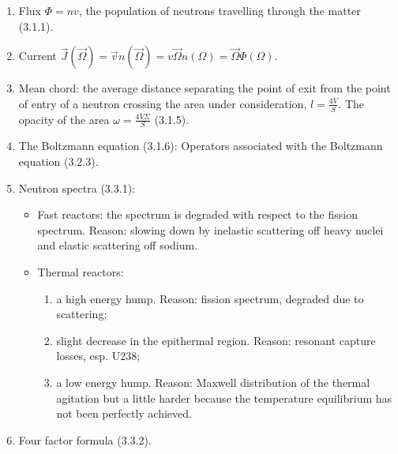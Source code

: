 \documentclass{school-22.211-notes}
\begin{document}
\clearpage
\begin{enumerate}
\item Flux $\Phi = n v$, the population of neutrons travelling through the matter (3.1.1). 
\item Current $\vec{J}(\vec{\Omega}) = \vec{v} n(\vec{\Omega}) = v \vec{\Omega} n(\Omega) = \vec{\Omega} \Phi(\Omega).$
\item Mean chord: the average distance separating the point of exit from the point of entry of a neutron crossing the area under consideration, $l = \frac{4V}{S}$. The opacity of the area $\omega = \frac{4V\Sigma}{S}$ (3.1.5). 
\item The Boltzmann equation (3.1.6): 
Operators associated with the Boltzmann equation (3.2.3).
\item Neutron spectra (3.3.1):
  \begin{itemize}
  \item Fast reactors: the spectrum is degraded with respect to the fission spectrum. Reason: slowing down by inelastic scattering off heavy nuclei and elastic scattering off sodium.
  \item Thermal reactors: 
    \begin{enumerate}
      \item a high energy hump. Reason: fission spectrum, degraded due to scattering; 
      \item slight decrease in the epithermal region. Reason: resonant capture losses, esp. U238; 
      \item  a low energy hump. Reason: Maxwell distribution of the thermal agitation but a little harder because the temperature equilibrium has not been perfectly achieved. 
    \end{enumerate}
  \end{itemize}
\item Four factor formula (3.3.2). 
\end{enumerate}
\end{document}
